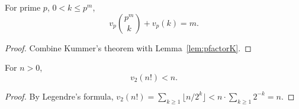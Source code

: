 \begin{lemma}
  \label{lem:logn_bin_prime_pow}
  \rocqok
  For prime $p$, $0 < k \leq p^m$,
  \[
    v_p\!\binom{p^m}{k} + v_p(k) = m.
  \]
  \begin{proof}
    \rocqok
    Combine Kummer's theorem with
    Lemma~\ref{lem:pfactorK}.
  \end{proof}
\end{lemma}

\begin{lemma}[$v_2(n!) < n$]
  \label{lem:logn2_fact_lt}
  \rocqok
  For $n > 0$,
  \[
    v_2(n!) < n.
  \]
  \begin{proof}
    \rocqok
    By Legendre's formula, $v_2(n!) = \sum_{k \geq 1} \lfloor n/2^k \rfloor
    < n \cdot \sum_{k \geq 1} 2^{-k} = n$.
  \end{proof}
\end{lemma}
